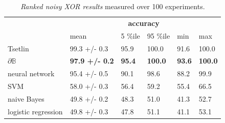 \documentclass{article}
\theoremstyle{plain}
\theoremstyle{definition}
\theoremstyle{remark}
\begin{document}
\begin{table}[t]
	\centering
	\begin{tabular}{llllll}
		\cline{2-6}
		\multicolumn{1}{c}{}                       & \multicolumn{5}{c}{\textbf{accuracy}}                                                                                                                                                            \\ \cline{2-6} 
		\multicolumn{1}{l|}{}                      & \multicolumn{1}{l|}{mean}                  & \multicolumn{1}{l|}{5 \%ile}       & \multicolumn{1}{l|}{95 \%ile}       & \multicolumn{1}{l|}{min}           & \multicolumn{1}{l|}{max}            \\ \hline
		\multicolumn{1}{|l|}{Tsetlin}              & \multicolumn{1}{l|}{99.3 +/- 0.3}          & \multicolumn{1}{l|}{95.9}          & \multicolumn{1}{l|}{100.0}          & \multicolumn{1}{l|}{91.6}          & \multicolumn{1}{l|}{100.0}          \\ \hline
		\multicolumn{1}{|l|}{$\partial\mathbb{B}$} & \multicolumn{1}{l|}{\textbf{97.9 +/- 0.2}} & \multicolumn{1}{l|}{\textbf{95.4}} & \multicolumn{1}{l|}{\textbf{100.0}} & \multicolumn{1}{l|}{\textbf{93.6}} & \multicolumn{1}{l|}{\textbf{100.0}} \\ \hline
		\multicolumn{1}{|l|}{neural network}       & \multicolumn{1}{l|}{95.4 +/- 0.5}          & \multicolumn{1}{l|}{90.1}          & \multicolumn{1}{l|}{98.6}           & \multicolumn{1}{l|}{88.2}          & \multicolumn{1}{l|}{99.9}           \\ \hline
		\multicolumn{1}{|l|}{SVM}                  & \multicolumn{1}{l|}{58.0 +/- 0.3}          & \multicolumn{1}{l|}{56.4}          & \multicolumn{1}{l|}{59.2}           & \multicolumn{1}{l|}{55.4}          & \multicolumn{1}{l|}{66.5}           \\ \hline
		\multicolumn{1}{|l|}{naive Bayes}          & \multicolumn{1}{l|}{49.8 +/- 0.2}          & \multicolumn{1}{l|}{48.3}          & \multicolumn{1}{l|}{51.0}           & \multicolumn{1}{l|}{41.3}          & \multicolumn{1}{l|}{52.7}           \\ \hline
		\multicolumn{1}{|l|}{logistic regression}  & \multicolumn{1}{l|}{49.8 +/- 0.3}          & \multicolumn{1}{l|}{47.8}          & \multicolumn{1}{l|}{51.1}           & \multicolumn{1}{l|}{41.1}          & \multicolumn{1}{l|}{53.1}           \\ \hline
	\end{tabular}
	\caption{{\em Ranked noisy XOR results}  measured over 100 experiments.}
	\label{tab:noisy-xor-results}
\end{table}
\end{document}
